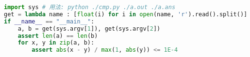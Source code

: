\documentclass[a4paper,landscape,twocolumn]{ctexart}
\begin{document}
\begin{lstlisting}[language=python]
import sys # 用法: python ./cmp.py ./a.out ./a.ans
get = lambda name : [float(i) for i in open(name, 'r').read().split()]
if __name__ == "__main__":
    a, b = get(sys.argv[1]), get(sys.argv[2])
    assert len(a) == len(b)
    for x, y in zip(a, b):
        assert abs(x - y) / max(1, abs(y)) <= 1E-4
\end{lstlisting}

%


%
%
\end{document}
